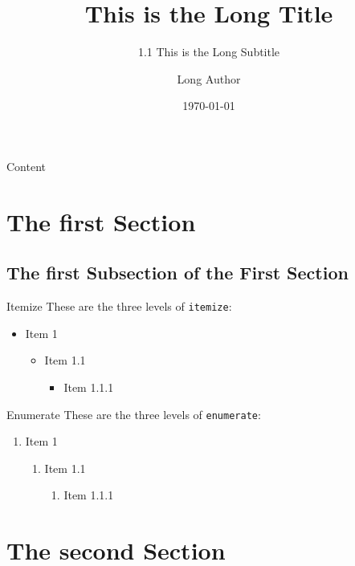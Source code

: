 \documentclass[aspectratio=169]{beamer}
\title[Short Title]{This is the Long Title}
\subtitle[1.1 Short Subtitle]{1.1 This is the Long Subtitle}
\author[Short Author]{Long Author}
\date{\today}
\begin{document}
    

    \begin{frame}{Content}
        \tableofcontents
    \end{frame}
    
    \section[First Section]{The first Section}

    \subsection[First Subsection]{The first Subsection of the First Section}
   
    \begin{frame}{Itemize}
        These are the three levels of \texttt{itemize}:
        \begin{itemize}
            \item Item 1
            \begin{itemize}
                \item Item 1.1
                \begin{itemize}
                    \item Item 1.1.1
                \end{itemize}
            \end{itemize}
        \end{itemize}
    \end{frame}

    \begin{frame}{Enumerate}
        These are the three levels of \texttt{enumerate}:
        \begin{enumerate}
            \item Item 1
            \begin{enumerate}
                \item Item 1.1
                \begin{enumerate}
                    \item Item 1.1.1
                \end{enumerate}
            \end{enumerate}
        \end{enumerate}
    \end{frame}

    \section[Second Section]{The second Section}
\end{document}
